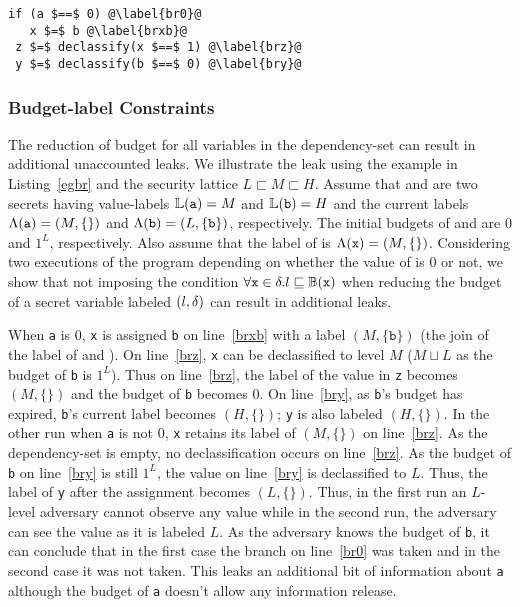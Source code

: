 \begin{lstlisting}[float,caption=Example to illustrate budget-label
  constraints,label=egbr] 
 if (a $==$ 0) @\label{br0}@
   x $=$ b @\label{brxb}@
 z $=$ declassify(x $==$ 1) @\label{brz}@
 y $=$ declassify(b $==$ 0) @\label{bry}@
\end{lstlisting}
\subsubsection{\textbf{Budget-label Constraints}}
\label{aspect:blc} 
The reduction of budget for all variables in the dependency-set can 
result in additional unaccounted leaks. 
We illustrate the leak using the example in Listing~\ref{egbr} and 
the security lattice $L \sqsubset M \sqsubset H$. Assume that
 and  are two secrets having value-labels $\mathbb{L}(\texttt{a})
= M$ and $\mathbb{L}(\texttt{b}) = H$ and the current labels $\Lambda(\texttt{a})
= (M, \{\})$ and $\Lambda(\texttt{b}) = (L, \{\texttt{b}\})$, respectively.  
The initial budgets of  and  are $0$ and $1^L$,
respectively. Also assume that the label of  is $\Lambda(\texttt{x})
= (M, \{\})$. Considering two executions of the program depending on
whether the value of  is $0$ or not, we show that not imposing
the condition $\forall \texttt{x} \in \delta. l \sqsubseteq \mathbb{B}(\texttt{x})$
when reducing the budget of a secret variable labeled $(l, \delta)$ can
result in additional leaks.  

When \texttt{a} is $0$, \texttt{x} is assigned \texttt{b} on
line~\ref{brxb} with a label $(M, \{\texttt{b}\})$ (the join of the
label of  and ). On line~\ref{brz}, \texttt{x} can be
declassified to level $M$ ($M \sqcup L$ as the budget of \texttt{b} is 
$1^L$). Thus on line~\ref{brz}, the label of the value in \texttt{z}
becomes $(M, \{\})$ and the budget of \texttt{b} becomes $0$. On  
line~\ref{bry}, as \texttt{b}'s budget has expired, \texttt{b}'s
current label becomes $(H, \{\})$; \texttt{y} is also labeled $(H,
\{\})$. In the other run when \texttt{a} is not $0$, \texttt{x}
retains its label of $(M, \{\})$ on line~\ref{brz}. As the
dependency-set is empty, no declassification occurs on
line~\ref{brz}. As the budget of \texttt{b} on line~\ref{bry} is still
$1^L$, the value on line~\ref{bry} is declassified to $L$. Thus, the
label of \texttt{y} after the assignment becomes $(L, \{\})$.  Thus,
in the first run an 
$L$-level adversary cannot observe any value while in the second run,
the adversary can see the value as it is labeled $L$. As the adversary
knows the budget of \texttt{b}, it can conclude that in the first case
the branch on line~\ref{br0} was taken and in the second case it was
not taken. This leaks an additional bit of information about
\texttt{a} although the budget of \texttt{a} doesn't allow any
information release. 

